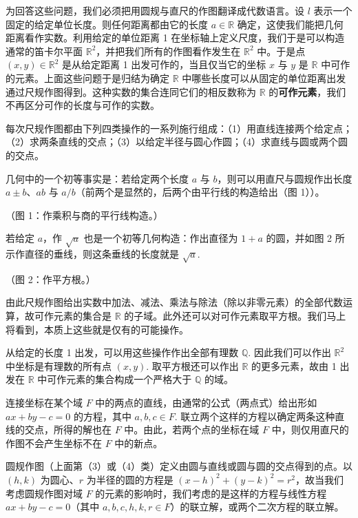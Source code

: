 为回答这些问题，我们必须把用圆规与直尺的作图翻译成代数语言。设 \(l\) 表示一个固定的给定单位长度。则任何距离都由它的长度 \(a \in \mathbb{R}\) 确定，这使我们能把几何距离看作实数。利用给定的单位距离 1 在坐标轴上定义尺度，我们于是可以构造通常的笛卡尔平面 \(\mathbb{R}^2\)，并把我们所有的作图看作发生在 \(\mathbb{R}^2\) 中。于是点 \((x, y) \in \mathbb{R}^2\) 是从给定距离 1 出发可作的，当且仅当它的坐标 \(x\) 与 \(y\) 是 \(\mathbb{R}\) 中可作的元素。上面这些问题于是归结为确定 \(\mathbb{R}\) 中哪些长度可以从固定的单位距离出发通过尺规作图得到。这种实数的集合连同它们的相反数称为 \(\mathbb{R}\) 的\textbf{可作元素}，我们不再区分可作的长度与可作的实数。

每次尺规作图都由下列四类操作的一系列施行组成：（1）用直线连接两个给定点；（2）求两条直线的交点；（3）以给定半径与圆心作圆；（4）求直线与圆或两个圆的交点。

几何中的一个初等事实是：若给定两个长度 \(a\) 与 \(b\)，则可以用直尺与圆规作出长度 \(a \pm b\)、\(ab\) 与 \(a/b\)（前两个是显然的，后两个由平行线的构造给出（图 1））。

\begin{center}（图 1：作乘积与商的平行线构造。）\end{center}

若给定 \(a\)，作 \(\sqrt{a}\) 也是一个初等几何构造：作出直径为 \(1+a\) 的圆，并如图 2 所示作直径的垂线，则这条垂线的长度就是 \(\sqrt{a}\).

\begin{center}（图 2：作平方根。）\end{center}

由此尺规作图给出实数中加法、减法、乘法与除法（除以非零元素）的全部代数运算，故可作元素的集合是 \(\mathbb{R}\) 的子域。此外还可以对可作元素取平方根。我们马上将看到，本质上这些就是仅有的可能操作。

从给定的长度 1 出发，可以用这些操作作出全部有理数 \(\mathbb{Q}\). 因此我们可以作出 \(\mathbb{R}^2\) 中坐标是有理数的所有点 \((x, y)\). 取平方根还可以作出 \(\mathbb{R}\) 的更多元素，故由 1 出发在 \(\mathbb{R}\) 中可作元素的集合构成一个严格大于 \(\mathbb{Q}\) 的域。

连接坐标在某个域 \(F\) 中的两点的直线，由通常的公式（两点式）给出形如 \(ax+by-c = 0\) 的方程，其中 \(a, b, c \in F\). 联立两个这样的方程以确定两条这种直线的交点，所得的解也在 \(F\) 中。由此，若两个点的坐标在域 \(F\) 中，则仅用直尺的作图不会产生坐标不在 \(F\) 中的新点。

圆规作图（上面第（3）或（4）类）定义由圆与直线或圆与圆的交点得到的点。以 \((h, k)\) 为圆心、\(r\) 为半径的圆的方程是 \((x-h)^2+(y-k)^2 = r^2\)，故当我们考虑圆规作图对域 \(F\) 的元素的影响时，我们考虑的是这样的方程与线性方程 \(ax+by-c = 0\)（其中 \(a, b, c, h, k, r \in F\)）的联立解，或两个二次方程的联立解。

